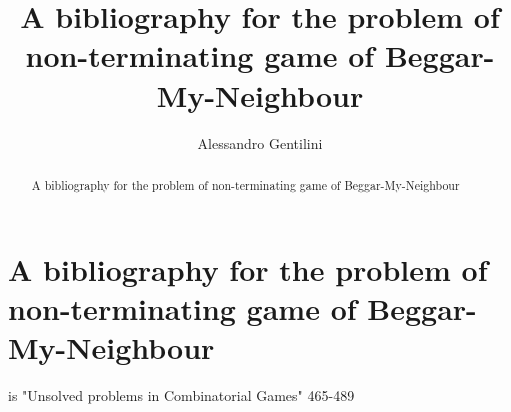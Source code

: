 \documentclass[a4paper,12pt]{article}
\title{A bibliography for the problem of non-terminating game of Beggar-My-Neighbour}
\author{Alessandro Gentilini}
\begin{document}
\maketitle

\begin{abstract}
A bibliography for the problem of non-terminating game of Beggar-My-Neighbour
\end{abstract} 

\section{A bibliography for the problem of non-terminating game of Beggar-My-Neighbour}

\cite{paulhus1999beggar}

\cite{albert2009games} is "Unsolved problems in Combinatorial Games" 465-489

\cite{spivey2010cycles}

\cite{DBLP:journals/corr/abs-1207-0016} 

\cite{russi}




\end{document}
